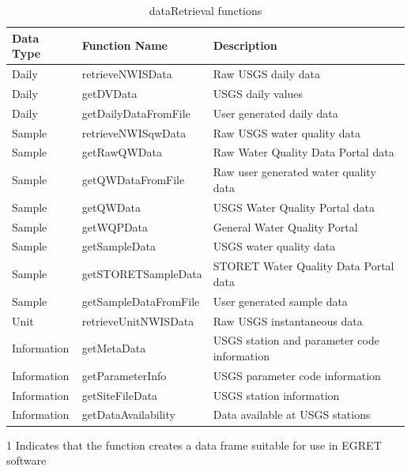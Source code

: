 \documentclass[a4paper,11pt]{article}\usepackage[]{graphicx}\usepackage[]{color}
\begin{document}
\begin{table}
  \centering
  \begin{threeparttable}[b]
  \caption{dataRetrieval functions}
  \label{tab:dataRetrievalFunctions1}
\begin{tabular}{lll}
  \hline
Data Type & Function Name & Description \\ 
  \hline
  Daily & retrieveNWISData & Raw USGS daily data \\
  Daily\tnote{1} & getDVData & USGS daily values \\
  Daily\tnote{1} & getDailyDataFromFile & User generated daily data \\
  Sample & retrieveNWISqwData & Raw USGS water quality data \\
  Sample & getRawQWData & Raw Water Quality Data Portal data \\
  Sample & getQWDataFromFile & Raw user generated water quality data \\
  Sample & getQWData & USGS Water Quality Portal data \\
  Sample & getWQPData & General Water Quality Portal\\
  Sample\tnote{1} & getSampleData & USGS water quality data\\  
  Sample\tnote{1} & getSTORETSampleData & STORET Water Quality Data Portal data \\
  Sample\tnote{1} & getSampleDataFromFile & User generated sample data \\
  Unit & retrieveUnitNWISData & Raw USGS instantaneous data \\  
  Information\tnote{1} & getMetaData & USGS station and parameter code information \\
  Information & getParameterInfo & USGS parameter code information \\
  Information & getSiteFileData & USGS station information \\
  Information & getDataAvailability & Data available at USGS stations \\
   \hline
\end{tabular}

  \begin{tablenotes}
    \item[1] Indicates that the function creates a data frame suitable for use in EGRET software
  \end{tablenotes}
 \end{threeparttable}
\end{table}
\end{document}
